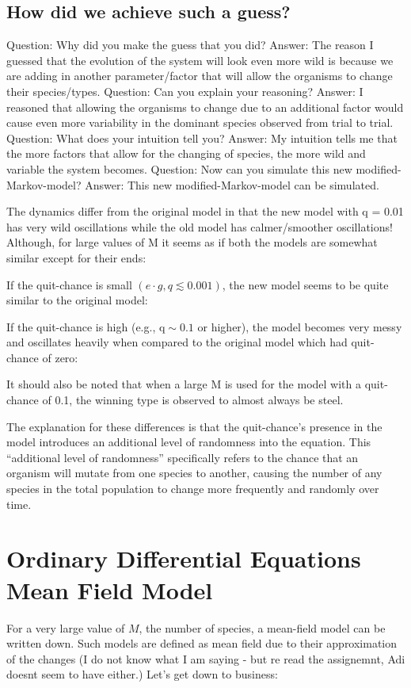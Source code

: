 \documentclass[border=1pt]{article}
\begin{document}
\subsection{How did we achieve such a guess?}
Question: Why did you make the guess that you did?
Answer: The reason I guessed that the evolution of the system will look even more wild is because we are adding in another parameter/factor that will allow the organisms to change their species/types.
Question: Can you explain your reasoning?
Answer: I reasoned that allowing the organisms to change due to an additional factor would cause even more variability in the dominant species observed from trial to trial.
Question: What does your intuition tell you?
Answer: My intuition tells me that the more factors that allow for the changing of species, the more wild and variable the system becomes.
Question: Now can you simulate this new modified-Markov-model?
Answer: This new modified-Markov-model can be simulated.

The dynamics differ from the original model in that the new model with q = 0.01 has very wild oscillations while the old model has calmer/smoother oscillations! Although, for large values of M it seems as if both the models are somewhat similar except for their ends:

If the quit-chance is small $(e \cdot g, q \lesssim 0.001)$, the new model seems to be quite similar to the original model:

If the quit-chance is high (e.g., $\mathrm{q} \sim 0.1$ or higher), the model becomes very messy and oscillates heavily when compared to the original model which had quit-chance of zero:

It should also be noted that when a large M is used for the model with a quit-chance of 0.1, the winning type is observed to almost always be steel.

The explanation for these differences is that the quit-chance’s presence in the model introduces an additional level of randomness into the equation. This “additional level of randomness” specifically refers to the chance that an organism will mutate from one species to another, causing the number of any species in the total population to change more frequently and randomly over time.
\section{Ordinary Differential Equations Mean Field Model}
For a very large value of $M$, the number of species, a mean-field model can be written down. Such models are defined as mean field due to their approximation of the changes (I do not know what I am saying - but re read the assignemnt, Adi doesnt seem to have either.) Let's get down to business:
\end{document}
